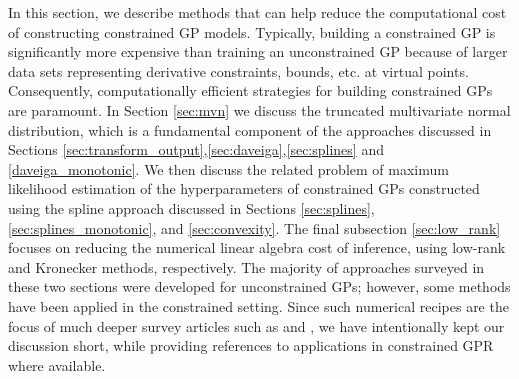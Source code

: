 \label{sec:computation_considerations}
In this section, we describe methods that can help reduce the computational cost of constructing constrained GP models. Typically, building a constrained GP is significantly more expensive than training an unconstrained GP because of larger data sets representing derivative constraints, bounds, etc. at virtual points. Consequently, computationally efficient strategies for building constrained GPs are paramount.
In Section \ref{sec:mvn} we discuss the truncated multivariate normal distribution, which is a fundamental component of the approaches discussed in Sections \ref{sec:transform_output},\ref{sec:daveiga},\ref{sec:splines} and \ref{daveiga_monotonic}. We then discuss the related problem of maximum likelihood estimation of the hyperparameters of constrained GPs constructed using the spline approach discussed in Sections \ref{sec:splines}, \ref{sec:splines_monotonic}, and \ref{sec:convexity}. 
The final subsection \ref{sec:low_rank} focuses on reducing the numerical linear algebra cost of inference, using low-rank and Kronecker methods, respectively. The majority of approaches surveyed in these two sections were developed for unconstrained GPs; however, some methods have been applied in the constrained setting. Since such numerical recipes are the focus of much deeper survey articles such as  and , we have intentionally kept our discussion short, while providing references to applications in constrained GPR where available.

